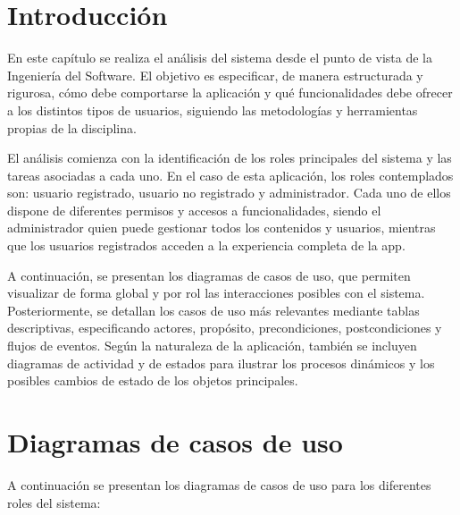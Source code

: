 

\section*{Introducción}

En este capítulo se realiza el análisis del sistema desde el punto de vista de la Ingeniería del Software. El objetivo es especificar, de manera estructurada y rigurosa, cómo debe comportarse la aplicación y qué funcionalidades debe ofrecer a los distintos tipos de usuarios, siguiendo las metodologías y herramientas propias de la disciplina.

El análisis comienza con la identificación de los roles principales del sistema y las tareas asociadas a cada uno. En el caso de esta aplicación, los roles contemplados son: usuario registrado, usuario no registrado y administrador. Cada uno de ellos dispone de diferentes permisos y accesos a funcionalidades, siendo el administrador quien puede gestionar todos los contenidos y usuarios, mientras que los usuarios registrados acceden a la experiencia completa de la app.

A continuación, se presentan los diagramas de casos de uso, que permiten visualizar de forma global y por rol las interacciones posibles con el sistema. Posteriormente, se detallan los casos de uso más relevantes mediante tablas descriptivas, especificando actores, propósito, precondiciones, postcondiciones y flujos de eventos. Según la naturaleza de la aplicación, también se incluyen diagramas de actividad y de estados para ilustrar los procesos dinámicos y los posibles cambios de estado de los objetos principales.

\section{Diagramas de casos de uso}

A continuación se presentan los diagramas de casos de uso para los diferentes roles del sistema:



